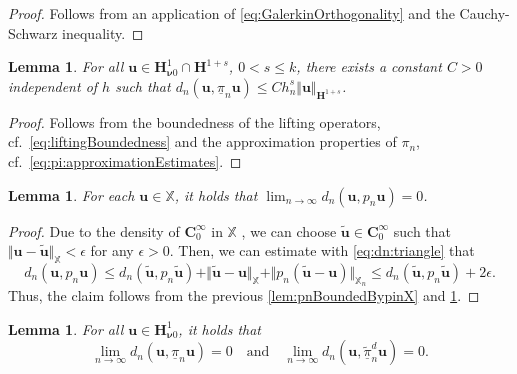 \documentclass{m2an}
\newcommand{\nv}{\boldsymbol{\nu}}
\renewcommand{\u}{\mathbf{u}}
\newcommand{\X}{\mathbb{X}}
\newcommand{\Xn}{\mathbb{X}_n}
\newcommand{\bH}{{\mathbf H}}
\newcommand{\pinX}{\underline{\pi}_n}
\newcommand{\pinXd}{\underline{\tilde{\pi}}_n^d}
\theoremstyle{plain}
\newtheorem{lemma}[theorem]{Lemma}
\theoremstyle{definition}
\begin{document}
\begin{proof}
   Follows from an application of \eqref{eq:GalerkinOrthogonality} and the Cauchy-Schwarz inequality.
\end{proof}

\begin{lemma}\label{lem:pinXRates}
   For all $\u \in \bH^1_{\nv 0} \cap \bH^{1+s}$, $0 < s \le k$, there exists a constant $C > 0$ independent of $h$ such that $d_n(\u,\pinX \u) \le C h_n^s \Vert \u \Vert_{\bH^{1+s}}$.
\end{lemma}

\begin{proof}
   Follows from the boundedness of the lifting operators, cf.~\eqref{eq:liftingBoundedness} and the approximation properties of $\pi_n$, cf.~\eqref{eq:pi:approximationEstimates}.
\end{proof}

\begin{lemma}\label{lem:dnpnuToZero}
   For each $\u \in \X$, it holds that $\lim_{n \to \infty} d_n(\u,p_n \u) = 0$.
\end{lemma}

\begin{proof}
   Due to the density of $\bm{C}^\infty_0$ in $\X$ \cite[Thm.~6]{HLS22H1}, we can choose $\tilde{\u} \in \bm{C}^\infty_0$ such that $\Vert \u - \tilde{\u} \Vert_{\X} < \epsilon$ for any $\epsilon > 0$. Then, we can estimate with \eqref{eq:dn:triangle} that 
   \begin{equation*}
      d_n(\u,p_n \u) \le d_n(\tilde{\u},p_n \tilde{\u}) + \Vert \tilde{\u} - \u \Vert_{\X}  + \Vert p_n (\tilde{\u} - \u) \Vert_{\Xn} \le d_n(\tilde{\u},p_n \tilde{\u}) + 2 \epsilon.
   \end{equation*}
   Thus, the claim follows from the previous \cref{lem:pnBoundedBypinX} and \cref{lem:pinXRates}.
\end{proof}


\begin{lemma}\label{lem:dnupinXdtoZero}%
   For all $\u \in \bH^1_{\nv 0}$, it holds that 
   \begin{equation}
      \lim_{n \to \infty} d_n(\u,\pinX \u) = 0 \quad \text{and} \quad \lim_{n \to \infty} d_n(\u,\pinXd \u) = 0.
   \end{equation} 
\end{lemma}
\end{document}
